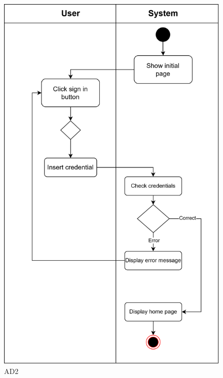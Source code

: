 \begin{figure}[H]
    \centering
    \includegraphics[width=0.75\linewidth]{Images/UseCasesDiagrams-Login.png}
    \caption{AD2}
    \label{AD2}
\end{figure}


